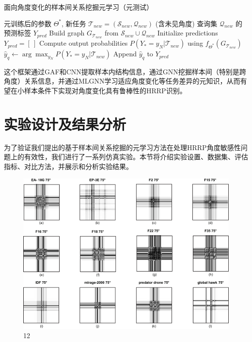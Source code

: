 \begin{algorithm}[htbp]
\caption{面向角度变化的样本间关系挖掘元学习（元测试）}
\label{alg:meta_testing_angle}
\begin{algorithmic}[1]
    \REQUIRE 元训练后的参数 $\Theta^*$, 新任务 $\mathcal{T}_{new} = (\mathcal{S}_{new}, \mathcal{Q}_{new})$ (含未见角度)
    \ENSURE 查询集 $\mathcal{Q}_{new}$ 的预测标签 $Y_{pred}$
    \STATE Build graph $G_{\mathcal{T}_{new}}$ from $\mathcal{S}_{new} \cup \mathcal{Q}_{new}$
    \STATE Initialize predictions $Y_{pred} = [~]$
        \STATE Compute output probabilities $P(Y_* = y_N | \mathcal{T}_{new})$ using $f_{\Theta^*}(G_{\mathcal{T}_{new}})$ %
        \STATE $\hat{y}_q \leftarrow \arg\max_{y_N} P(Y_* = y_N | \mathcal{T}_{new})$
        \STATE Append $\hat{y}_q$ to $Y_{pred}$
    \ENDFOR
\end{algorithmic}
\end{algorithm}

这个框架通过GAF和CNN提取样本内结构信息，通过GNN挖掘样本间（特别是跨角度）关系信息，并通过MLGNN学习适应角度变化等任务差异的元知识，从而有望在小样本条件下实现对角度变化具有鲁棒性的HRRP识别。

\section{实验设计及结果分析}
\label{sec:experiments_angle}

为了验证我们提出的基于样本间关系挖掘的元学习方法在处理HRRP角度敏感性问题上的有效性，我们进行了一系列仿真实验。本节将介绍实验设置、数据集、评估指标、对比方法，并展示和分析实验结果。


\begin{figure}[!h]
\centering
\includegraphics[width=0.75\linewidth]{figures/gaf_samples.pdf} %
\caption{12}
\label{Fig_10}
\end{figure}


